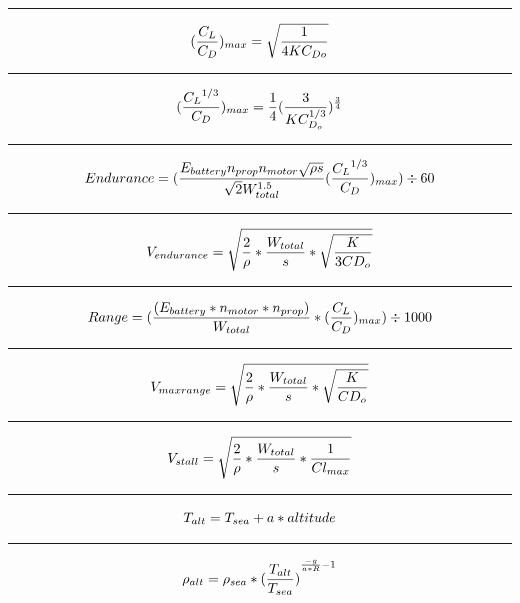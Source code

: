 \documentclass[12pt,A4paper]{article}
\begin{document}
	\hrule
	\vspace{0.1 in}
	\begin{equation}
		(\frac{C_L}{C_D})_{max} = \sqrt{\frac{1}{4 K C_{D o}}} \\
	\end{equation}
	\hrule
	\vspace{0.1 in}
	\begin{equation}
		(\frac{{C_L}^{1/3}}{C_D})_{max} = \frac{1}{4} (\frac{3}{K C_{D_o}^{1/3}})^{\frac{3}{4}} \\
	\end{equation}
	\hrule
	\vspace{0.1 in}
	\begin{equation}
		Endurance = (\frac{E_{battery} n_{prop} n_{motor} \sqrt{\rho s}}{\sqrt{2} W_{total}^{1.5}} (\frac{{C_L}^{1/3}}{C_D})_{max}) \div 60 \\
	\end{equation}
	\hrule
	\vspace{0.1 in}
	\begin{equation}
		V_{endurance} = \sqrt{\frac{2}{\rho} * \frac{W_{total}}{s} * \sqrt{\frac{K}{3  CD_o}}} \\
	\end{equation}
	\hrule
	\vspace{0.1 in}
	\begin{equation}
		Range = (\frac{(E_{battery} * n_{motor} * n_{prop})}{W_{total}} * (\frac{C_L}{C_D})_{max}) \div 1000 \\
	\end{equation}
	\hrule
	\vspace{0.1 in}
	\begin{equation}
		V_{maxrange} = \sqrt{\frac{2}{\rho} * \frac{W_{total}}{s} * \sqrt{\frac{K}{CD_o}}}\\
	\end{equation}
	\hrule
	\vspace{0.1 in}
	\begin{equation}
		V_{stall} = \sqrt{\frac{2}{\rho}*\frac{W_{total}}{s}*\frac{1}{Cl_{max}}} \\
	\end{equation}
	\hrule
	\vspace{0.1 in}
	\begin{equation}
		T_{alt} = T_{sea} + a*altitude \\
	\end{equation}
	\hrule
	\vspace{0.1 in}
	\begin{equation}
		\rho_{alt} = \rho_{sea} * {(\frac{T_{alt}}{T_{sea}})}^{\frac{-g}{a*R}-1}\\
	\end{equation}
\end{document}
